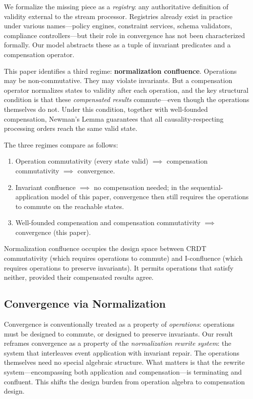 \documentclass[11pt,a4paper]{article}
\theoremstyle{plain}
\theoremstyle{definition}
\theoremstyle{remark}
\begin{document}
We formalize the missing piece as a \emph{registry}: any authoritative
definition of validity external to the stream processor.  Registries already
exist in practice under various names---policy engines, constraint services,
schema validators, compliance controllers---but their role in convergence has
not been characterized formally.  Our model abstracts these as a tuple of
invariant predicates and a compensation operator.

This paper identifies a third regime: \textbf{normalization confluence}.
Operations may be non-commutative.  They may violate invariants.  But a
compensation operator normalizes states to validity after each operation, and
the key structural condition is that these \emph{compensated results}
commute---even though the operations themselves do not.  Under this condition,
together with well-founded compensation, Newman's Lemma guarantees that all
causality-respecting processing orders reach the same valid state.

The three regimes compare as follows:
\begin{enumerate}[leftmargin=*,nosep]
\item Operation commutativity (every state valid) $\implies$ compensation
  commutativity $\implies$ convergence.
\item Invariant confluence $\implies$ no compensation needed; in the
  sequential-application model of this paper, convergence then still
  requires the operations to commute on the reachable states.
\item Well-founded compensation and compensation commutativity $\implies$
  convergence (this paper).
\end{enumerate}
Normalization confluence occupies the design space between CRDT commutativity
(which requires operations to commute) and I-confluence (which requires
operations to preserve invariants).  It permits operations that satisfy
neither, provided their compensated results agree.

\subsection{Convergence via Normalization}

Convergence is conventionally treated as a property of \emph{operations}:
operations must be designed to commute, or designed to preserve invariants.
Our result reframes convergence as a property of the \emph{normalization
rewrite system}: the system that interleaves event application with invariant
repair.  The operations themselves need no special algebraic structure.  What
matters is that the rewrite system---encompassing both application and
compensation---is terminating and confluent.  This shifts the design burden
from operation algebra to compensation design.
\end{document}
